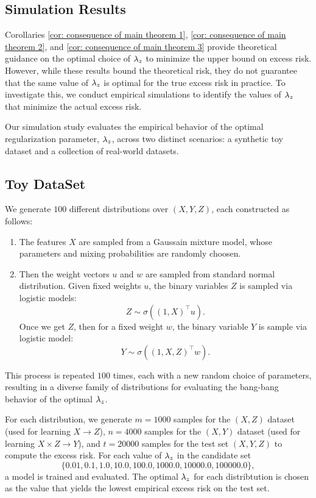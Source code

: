 
\subsection{Simulation Results}

Corollaries \ref{cor: consequence of main theorem 1}, \ref{cor: consequence of main theorem 2}, and \ref{cor: consequence of main theorem 3} provide theoretical guidance on the optimal choice of $\lambda_z$ to minimize the upper bound on excess risk. However, while these results bound the theoretical risk, they do not guarantee that the same value of $\lambda_z$ is optimal for the true excess risk in practice. To investigate this, we conduct empirical simulations to identify the values of $\lambda_z$ that minimize the actual excess risk.

Our simulation study evaluates the empirical behavior of the optimal regularization parameter, $\lambda_z$, across two distinct scenarios: a synthetic toy dataset and a collection of real-world datasets.

\subsection{Toy DataSet}
We generate $100$ different distributions over $(X, Y, Z)$, each constructed as follows:

\begin{enumerate}
    \item The features $X$ are sampled from a Gaussain mixture model, whose parameters and mixing probabilities are randomly choosen.
    
    \item Then the weight vectors $u$ and $w$ are sampled from standard normal distribution.    
    Given fixed weights $u$, the binary variables $Z$ is sampled via logistic models:
    \[ Z \sim \sigma((1,X)^\top u).\]
    Once we get $Z$, then for a fixed weight $w$, the binary variable $Y$ is sample via logistic model:
    \[ Y \sim \sigma((1,X,Z)^\top w).\]
    
\end{enumerate}

This process is repeated $100$ times, each with a new random choice of parameters, resulting in a diverse family of distributions for evaluating the bang-bang behavior of the optimal $\lambda_z$.

For each distribution, we generate $m=1000$ samples for the $(X, Z)$ dataset (used for learning $X \to Z$), $n=4000$ samples for the $(X, Y)$ dataset (used for learning $X \times Z \to Y$), and $t=20000$ samples for the test set $(X, Y, Z)$ to compute the excess risk. 
For each value of $\lambda_z$ in the candidate set
\begin{equation*}
    \{0.01, 0.1, 1.0, 10.0, 100.0, 1000.0, 10000.0, 100000.0\},
\end{equation*}
a model is trained and evaluated. The optimal $\lambda_z$ for each distribtution is chosen as the value that yields the lowest empirical excess risk on the test set.

